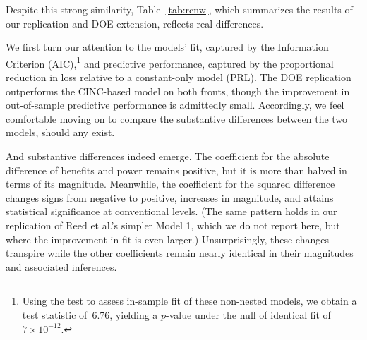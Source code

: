 Despite this strong similarity, Table~\ref{tab:rcnw}, which summarizes the results of our replication and DOE extension, reflects real differences.
\begin{table}[!ht]
\centering

\caption{%
  Replication of Table 1, Model 2 of \citet[1213]{reed2008war}.
  The unit of analysis is the dyad-year, and the dependent variable is the onset of a militarized interstate dispute.
  The proportional reduction in loss over the constant-only model comes from 100 repetitions of 10-fold cross-validation.
}
\label{tab:rcnw}
\end{table}
We first turn our attention to the models' fit, captured by the \citet{Akaike:1974ih} Information Criterion (AIC),\footnote{%
  Using the \citet{Vuong:1989uf} test to assess in-sample fit of these non-nested models, we obtain a test statistic of~6.76, yielding a $p$-value under the null of identical fit of $7 \times 10^{-12}$.
} and predictive performance, captured by the proportional reduction in loss relative to a constant-only model (PRL).
The DOE replication outperforms the CINC-based model on both fronts, though the improvement in out-of-sample predictive performance is admittedly small.
Accordingly, we feel comfortable moving on to compare the substantive differences between the two models, should any exist.

And substantive differences indeed emerge.
The coefficient for the absolute difference of benefits and power remains positive, but it is more than halved in terms of its magnitude.
Meanwhile, the coefficient for the squared difference changes signs from negative to positive, increases in magnitude, and attains statistical significance at conventional levels.
(The same pattern holds in our replication of Reed et al.'s simpler Model 1, which we do not report here, but where the improvement in fit is even larger.)
Unsurprisingly, these changes transpire while the other coefficients remain nearly identical in their magnitudes and associated inferences.

